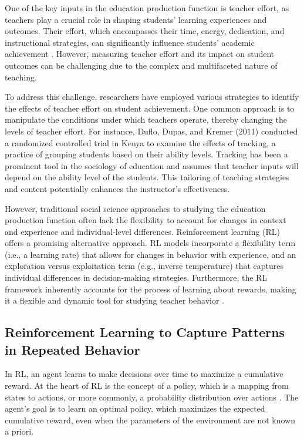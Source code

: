 \documentclass[
  number,
  preprint,
  3p,
  onecolumn]{elsarticle}
\begin{document}
One of the key inputs in the education production function is teacher
effort, as teachers play a crucial role in shaping students' learning
experiences and outcomes. Their effort, which encompasses their time,
energy, dedication, and instructional strategies, can significantly
influence students' academic achievement \citep{rivkin2005}. However,
measuring teacher effort and its impact on student outcomes can be
challenging due to the complex and multifaceted nature of teaching.

To address this challenge, researchers have employed various strategies
to identify the effects of teacher effort on student achievement. One
common approach is to manipulate the conditions under which teachers
operate, thereby changing the levels of teacher effort. For instance,
Duflo, Dupas, and Kremer (2011) \citep{duflo2011} conducted a randomized
controlled trial in Kenya to examine the effects of tracking, a practice
of grouping students based on their ability levels. Tracking has been a
prominent tool in the sociology of education and assumes that teacher
inputs will depend on the ability level of the students. This tailoring
of teaching strategies and content potentially enhances the instructor's
effectiveness.

However, traditional social science approaches to studying the education
production function often lack the flexibility to account for changes in
context and experience and individual-level differences. Reinforcement
learning (RL) offers a promising alternative approach. RL models
incorporate a flexibility term (i.e., a learning rate) that allows for
changes in behavior with experience, and an exploration versus
exploitation term (e.g., inverse temperature) that captures individual
differences in decision-making strategies. Furthermore, the RL framework
inherently accounts for the process of learning about rewards, making it
a flexible and dynamic tool for studying teacher behavior
\citep{sutton2018}.

\hypertarget{reinforcement-learning-to-capture-patterns-in-repeated-behavior}{%
\subsection{Reinforcement Learning to Capture Patterns in Repeated
Behavior}\label{reinforcement-learning-to-capture-patterns-in-repeated-behavior}}

In RL, an agent learns to make decisions over time to maximize a
cumulative reward. At the heart of RL is the concept of a policy, which
is a mapping from states to actions, or more commonly, a probability
distribution over actions \citep{sutton2018}. The agent's goal is to
learn an optimal policy, which maximizes the expected cumulative reward,
even when the parameters of the environment are not known a priori.
\end{document}
